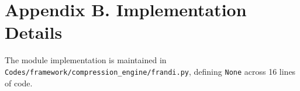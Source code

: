 \section*{Appendix B. Implementation Details}
The module implementation is maintained in \texttt{Codes/framework/compression\_engine/frandi.py}, defining \texttt{None} across 16 lines of code.
